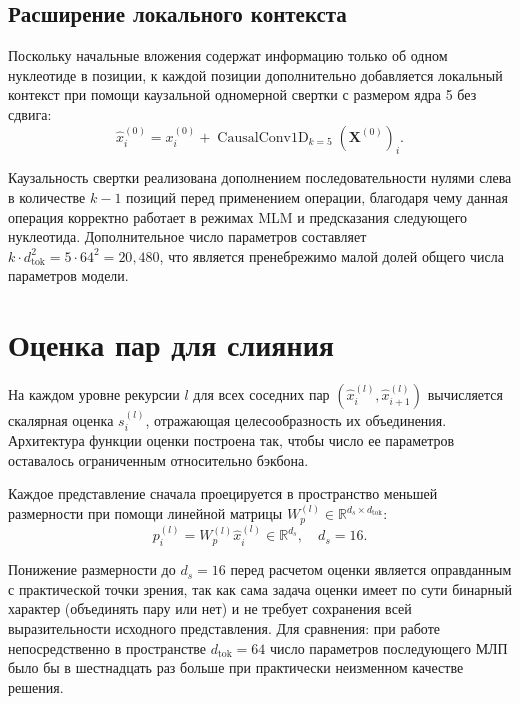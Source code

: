 \subsection{Расширение локального контекста}

Поскольку начальные вложения содержат информацию только об одном
нуклеотиде в позиции, к каждой позиции дополнительно добавляется
локальный контекст при помощи каузальной одномерной свертки с размером
ядра 5 без сдвига:
\begin{equation}
  \hat x_i^{(0)} = x_i^{(0)} + \operatorname{CausalConv1D}_{k=5}(\mathbf X^{(0)})_i.
  \label{eq:contextualizer}
\end{equation}

Каузальность свертки реализована дополнением последовательности нулями
слева в количестве $k - 1$ позиций перед применением операции, благодаря
чему данная операция корректно работает в режимах MLM и предсказания
следующего нуклеотида. Дополнительное число параметров составляет
$k \cdot d_{\text{tok}}^2 = 5 \cdot 64^2 = 20{,}480$, что является
пренебрежимо малой долей общего числа параметров модели.

\section{Оценка пар для слияния}

На каждом уровне рекурсии $l$ для всех соседних пар
$(\hat x_i^{(l)}, \hat x_{i+1}^{(l)})$ вычисляется скалярная оценка
$s_i^{(l)}$, отражающая целесообразность их объединения. Архитектура
функции оценки построена так, чтобы число ее параметров оставалось
ограниченным относительно бэкбона.

Каждое представление сначала проецируется в пространство меньшей
размерности при помощи линейной матрицы $W_p^{(l)} \in
\mathbb{R}^{d_s \times d_{\text{tok}}}$:
\begin{equation}
  p_i^{(l)} = W_p^{(l)} \hat x_i^{(l)} \in \mathbb{R}^{d_s},
  \quad d_s = 16.
  \label{eq:projection}
\end{equation}

Понижение размерности до $d_s = 16$ перед расчетом оценки является
оправданным с практической точки зрения, так как сама задача оценки
имеет по сути бинарный характер (объединять пару или нет) и не
требует сохранения всей выразительности исходного представления. Для
сравнения: при работе непосредственно в пространстве $d_{\text{tok}}
= 64$ число параметров последующего МЛП было бы в шестнадцать раз
больше при практически неизменном качестве решения.

